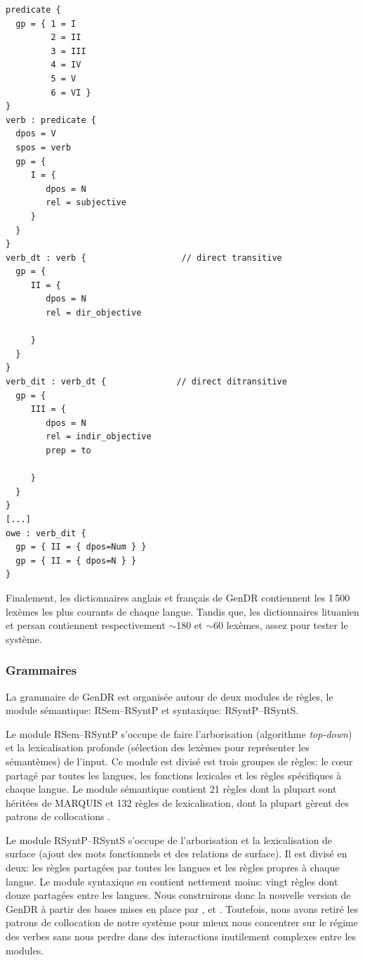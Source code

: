 \begin{lstlisting}[language=mate, caption = Échantillon du \emph{lexicon}, label=fig:lexicon]
predicate {
  gp = { 1 = I
         2 = II
         3 = III
         4 = IV
         5 = V
         6 = VI }
}
verb : predicate {
  dpos = V
  spos = verb
  gp = {
     I = {
        dpos = N
        rel = subjective
     }
  }
}
verb_dt : verb {                   // direct transitive
  gp = {
     II = {
        dpos = N
        rel = dir_objective

     }
  }
}
verb_dit : verb_dt {              // direct ditransitive
  gp = {
     III = {
        dpos = N
        rel = indir_objective
        prep = to  

     }
  }
}
[...]
owe : verb_dit {
  gp = { II = { dpos=Num } }
  gp = { II = { dpos=N } }
}
\end{lstlisting}


Finalement, les dictionnaires anglais et français de GenDR contiennent les 1\,500 lexèmes les plus courants de chaque langue. Tandis que, les dictionnaires lituanien \citep{dubinskaite17} et persan contiennent respectivement $\sim$180 et $\sim$60 lexèmes, assez pour tester le système.


\subsubsection{Grammaires}
La grammaire de GenDR est organisée autour de deux modules de règles, le module sémantique: \ac{RSem}--\ac{RSyntP} et syntaxique: \ac{RSyntP}--\ac{RSyntS}. 

Le module \ac{RSem}--\ac{RSyntP} s'occupe de faire l'arborisation (algorithme \emph{top-down}) et la lexicalisation profonde (sélection des lexèmes pour représenter les sémantèmes) de l'input. Ce module est divisé est trois groupes de règles: le c\oe{}ur partagé par toutes les langues, les fonctions lexicales et les règles spécifiques à chaque langue. Le module sémantique contient 21 règles dont la plupart sont héritées de MARQUIS et 132 règles de lexicalisation, dont la plupart gèrent des patrons de collocations \citep{LambreyImplementationcollocationspour2017}.

Le module \ac{RSyntP}--\ac{RSyntS} s'occupe de l'arborisation et la lexicalisation de surface (ajout des mots fonctionnels et des relations de surface). Il est divisé en deux: les règles partagées par toutes les langues et les règles propres à chaque langue. Le module syntaxique en contient nettement moins: vingt règles dont douze partagées entre les langues. Nous construirons donc la nouvelle version de GenDR à partir des bases mises en place par \cite{LambreyImplementationcollocationspour2017}, \cite{dubinskaite17} et \cite{lareau18}. Toutefois, nous avons retiré les patrons de collocation de notre système pour mieux nous concentrer sur le régime des verbes sans nous perdre dans des interactions inutilement complexes entre les modules.

